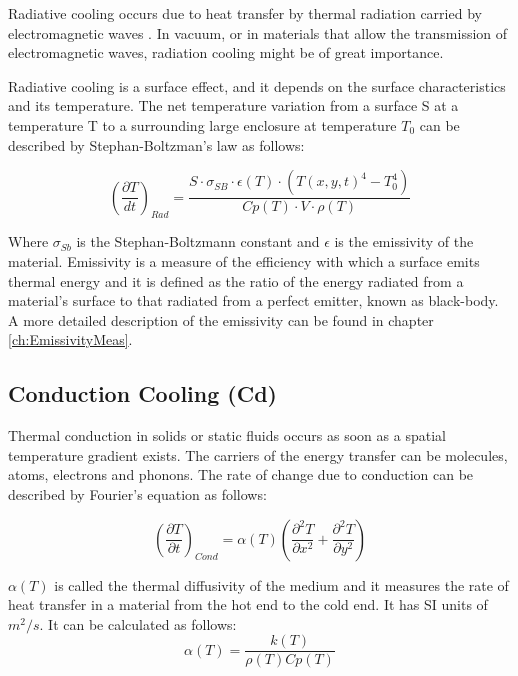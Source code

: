Radiative cooling occurs due to heat transfer by thermal radiation carried by electromagnetic waves \parencite[][]{ref:RadiativeCooling}. In vacuum,  or in materials that allow the transmission of electromagnetic waves, radiation cooling might be of great importance. 

Radiative cooling is a surface effect, and it depends on the surface characteristics and its temperature.  The net temperature variation from a surface S at a temperature T to a surrounding large enclosure at temperature $T_0$ can be described by Stephan-Boltzman's law as follows: 

\begin{equation}
    \left( \frac{\partial T}{dt} \right)_{Rad} = \frac{S\cdot \sigma_{SB}\cdot \epsilon(T)\cdot \left(T(x,y,t)^4 - T_0^4\right)}{Cp(T)\cdot V \cdot \rho(T)}
\end{equation}

Where $\sigma_{Sb}$ is the Stephan-Boltzmann constant and $\epsilon$ is the emissivity of the material. Emissivity is a measure of the efficiency with which a surface emits thermal energy and it is defined as the ratio of the energy radiated from a material's surface to that radiated from a perfect emitter, known as black-body. A more detailed description of the emissivity can be found in chapter \ref{ch:EmissivityMeas}. 

\subsection{Conduction Cooling (Cd)}
\label{sec:ConductionCooling}

Thermal conduction in solids or static fluids \parencite[][]{ref:ConductionCooling} occurs as soon as a spatial temperature gradient exists. The carriers of the energy transfer can be molecules, atoms, electrons and phonons. The rate of change due to conduction can be described by Fourier's equation as follows: 

\begin{equation}
    \left( \frac{\partial T}{\partial t} \right)_{Cond} = \alpha (T) \left( \frac{\partial^2 T}{\partial x^2} + \frac{\partial^2 T}{\partial y^2} \right)
\end{equation}

$\alpha(T)$ is called the thermal diffusivity of the medium and it measures the rate of heat transfer in a material from the hot end to the cold end. It has SI units of $m^2 /s$. It can be calculated as follows: 
\begin{equation}
    \alpha(T) = \frac{k(T)}{\rho(T)Cp(T)}
\end{equation}

